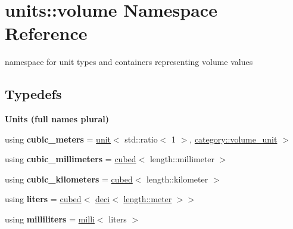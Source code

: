 \hypertarget{namespaceunits_1_1volume}{}\section{units\+:\+:volume Namespace Reference}
\label{namespaceunits_1_1volume}


namespace for unit types and containers representing volume values  


\subsection*{Typedefs}
\begin{Indent}{\bf Units (full names plural)}\par
\begin{DoxyCompactItemize}
\item 
\hypertarget{namespaceunits_1_1volume_a20f405db565363677fd8c459d2c44dc6}{}using {\bfseries cubic\+\_\+meters} = \hyperlink{structunits_1_1unit}{unit}$<$ std\+::ratio$<$ 1 $>$, \hyperlink{namespaceunits_1_1category_a69c6c6f05a27aa247360cbcf1455f7f2}{category\+::volume\+\_\+unit} $>$\label{namespaceunits_1_1volume_a20f405db565363677fd8c459d2c44dc6}

\item 
\hypertarget{namespaceunits_1_1volume_a747743c1d3118fe532a965cd46368e6f}{}using {\bfseries cubic\+\_\+millimeters} = \hyperlink{group___unit_manipulators_gad3e94dc693fe45a580b382cb666434a1}{cubed}$<$ length\+::millimeter $>$\label{namespaceunits_1_1volume_a747743c1d3118fe532a965cd46368e6f}

\item 
\hypertarget{namespaceunits_1_1volume_a21cda03665a197b5a4bfe69d352167ea}{}using {\bfseries cubic\+\_\+kilometers} = \hyperlink{group___unit_manipulators_gad3e94dc693fe45a580b382cb666434a1}{cubed}$<$ length\+::kilometer $>$\label{namespaceunits_1_1volume_a21cda03665a197b5a4bfe69d352167ea}

\item 
\hypertarget{namespaceunits_1_1volume_a0cc1357bde7107a01e30cfd50478726a}{}using {\bfseries liters} = \hyperlink{group___unit_manipulators_gad3e94dc693fe45a580b382cb666434a1}{cubed}$<$ \hyperlink{group___unit_manipulators_ga21c21d358600828a0a49380d9df693b9}{deci}$<$ \hyperlink{structunits_1_1unit}{length\+::meter} $>$$>$\label{namespaceunits_1_1volume_a0cc1357bde7107a01e30cfd50478726a}

\item 
\hypertarget{namespaceunits_1_1volume_aaca1665b2097d1260077dcfb5d0bff65}{}using {\bfseries milliliters} = \hyperlink{group___unit_manipulators_gaec9d1c320e180eb59f3cb3094d8079dd}{milli}$<$ liters $>$\label{namespaceunits_1_1volume_aaca1665b2097d1260077dcfb5d0bff65}


\end{DoxyCompactItemize}
\end{Indent}
